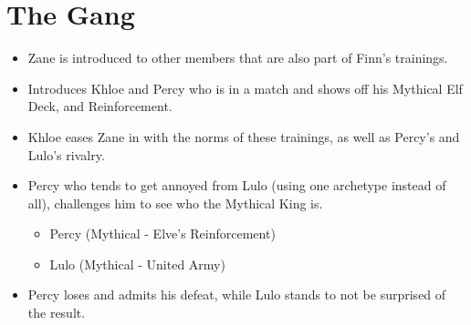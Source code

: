 \section{The Gang}
\begin{itemize}
    \item Zane is introduced to other members that are also part of Finn’s trainings.
    \item Introduces Khloe and Percy who is in a match and shows off his Mythical Elf Deck, and Reinforcement.
    \item Khloe eases Zane in with the norms of these trainings, as well as Percy’s and Lulo’s rivalry.
    \item Percy who tends to get annoyed from Lulo (using one archetype instead of all), challenges him to see who the Mythical King is.
    \begin{itemize}
        \item Percy (Mythical - Elve’s Reinforcement)
        \item Lulo (Mythical - United Army)
    \end{itemize}
    \item Percy loses and admits his defeat, while Lulo stands to not be surprised of the result.
\end{itemize}